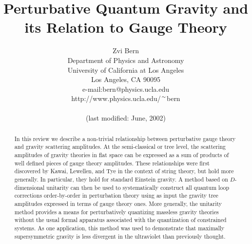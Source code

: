 


\RequirePackage{epsf}
\RequirePackage{longtable}

\newcommand{\mathbold}[1]{\mbox{\boldmath $#1$}}


\def\draftnote#1{{\it #1}}



\title{Perturbative Quantum Gravity and its Relation to
Gauge Theory}

\author{Zvi Bern \\
        Department of Physics and Astronomy\\
        University of California at Los Angeles \\
        Los Angeles, CA 90095 \\
        e-mail:bern@physics.ucla.edu \\
        http://www.physics.ucla.edu/${\sim \atop \null}\hskip -.03 cm$bern\\
\\
\small{(last modified: June, 2002)}
}

\date{}
\maketitle

\begin{abstract}

In this review we describe a non-trivial relationship between
perturbative gauge theory and gravity scattering amplitudes.
At the semi-classical or tree level, the scattering amplitudes of
gravity theories in flat space can be expressed as a sum of products
of well defined pieces of gauge theory amplitudes. These relationships
were first discovered by Kawai, Lewellen, and Tye in the context of
string theory, but hold more generally.  In particular, they hold for
standard Einstein gravity. A method based on $D$-dimensional unitarity
can then be used to systematically construct all quantum loop
corrections order-by-order in perturbation theory using as input the
gravity tree amplitudes expressed in terms of gauge theory ones.  More
generally, the unitarity method provides a means for perturbatively
quantizing massless gravity theories without the usual formal
apparatus associated with the quantization of constrained systems.  As
one application, this method was used to demonstrate that maximally
supersymmetric gravity is less divergent in the ultraviolet than
previously thought.

\end{abstract}

